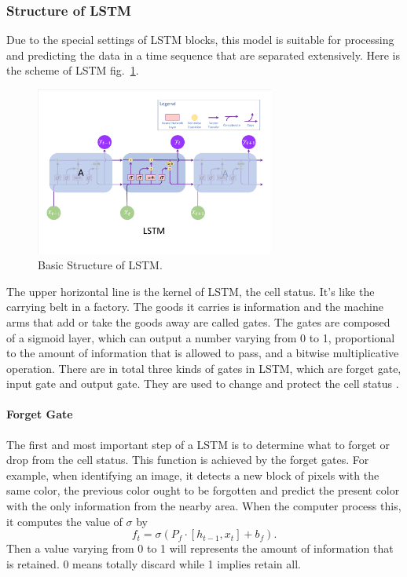 \documentclass{mcmthesis}
\begin{document}
\subsubsection{Structure of LSTM}
Due to the special settings of LSTM blocks, this model is suitable for processing and predicting the data in a time sequence that are separated extensively. Here is the scheme of LSTM fig.~\ref{fig:LSTM}.

\begin{figure}[!htbp]
	\centering
 	\includegraphics[width = 0.7\textwidth]{LSTM.pdf} 
	\caption{Basic Structure of LSTM.}
	\label{fig:LSTM}
\end{figure}

The upper horizontal line is the kernel of LSTM, the cell status. It's like the carrying belt in a factory. The goods it carries is information and the machine arms that add or take the goods away are called gates. The gates are composed of a sigmoid layer, which can output a number varying from 0 to 1, proportional to the amount of information that is allowed to pass, and a bitwise multiplicative operation. There are in total three kinds of gates in LSTM, which are forget gate, input gate and output gate. They are used to change and protect the cell status \cite{LSTM}.

\paragraph{Forget Gate}
The first and most important step of a LSTM is to determine what to forget or drop from the cell status. This function is achieved by the forget gates. For example, when identifying an image, it detects a new block of pixels with the same color, the previous color ought to be forgotten and predict the present color with the only information from the nearby area. When the computer process this, it computes the value of $\sigma$ by
\begin{equation}
	f_{t}=\sigma(P_{f}\cdot [h_{t-1}, x_{t}]+b_{f}).
\end{equation}
Then a value varying from 0 to 1 will represents the amount of information that is retained. 0 means totally discard while 1 implies retain all.
\end{document}
